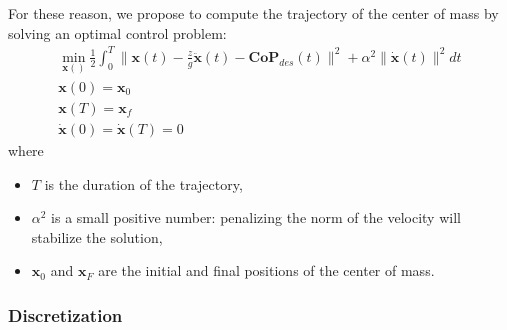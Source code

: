\documentclass{article}
\newcommand\vect[1]{\mathbf{#1}}
\newcommand\x{\vect{x}}
\newcommand\dx{\vect{\dot{x}}}
\newcommand\ddx{\vect{\ddot{x}}}
\begin{document}
For these reason, we propose to compute the trajectory of the center of mass by solving an optimal control problem:
\begin{equation}
  \begin{array}{l}
    \min_{\x()}\frac{1}{2}\int_0^T \|\x(t) - \frac{z}{g}\ddx(t) - \vect{CoP}_{des}(t)\|^2 + \alpha^2\|\dx(t)\|^2 dt\\
    \x(0)=\x_0\\
    \x(T)=\x_f\\
    \dx(0)=\dx(T)=0
  \end{array}
    \label{eq:optimal-control}
\end{equation}
where
\begin{itemize}
\item $T$ is the duration of the trajectory,
\item $\alpha^2$ is a small positive number: penalizing the norm of the velocity will stabilize the solution,
\item $\x_0$ and $\x_F$ are the initial and final positions of the center of mass.
\end{itemize}

\subsubsection{Discretization}
\end{document}
